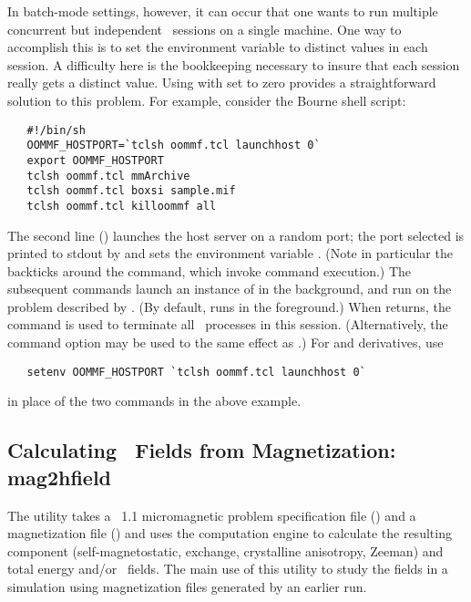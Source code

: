 In batch-mode settings, however, it can occur that one wants to run
multiple concurrent but independent \OOMMF\ sessions on a single
machine.  One way to accomplish this is to set the environment
variable  to distinct values in each session.
A difficulty here is the bookkeeping necessary to insure that each
session really gets a distinct value.  Using  with
 set to zero provides a straightforward solution to this
problem.  For example, consider the Bourne shell script:
\begin{verbatim}
   #!/bin/sh
   OOMMF_HOSTPORT=`tclsh oommf.tcl launchhost 0`
   export OOMMF_HOSTPORT
   tclsh oommf.tcl mmArchive
   tclsh oommf.tcl boxsi sample.mif
   tclsh oommf.tcl killoommf all
\end{verbatim}
The second line () launches the host server
on a random port; the port selected is printed to stdout by
 and sets the environment variable
.  (Note in particular the backticks around the
 command, which invoke command execution.)  The
subsequent commands launch an instance of  in the
background, and run  on the problem described by
.  (By default,  runs in the foreground.)
When  returns, the  command is used to
terminate all \OOMMF\ processes in this session.  (Alternatively, the
 command option  may be used to the same effect
as .)  For  and derivatives, use
\begin{verbatim}
   setenv OOMMF_HOSTPORT `tclsh oommf.tcl launchhost 0`
\end{verbatim}
in place of the two  commands in the above
example.



\subsection{Calculating \vH\ Fields from Magnetization:
            mag2hfield}\label{sec:mag2hfield}%

The  utility takes a
\MIF~1.1 micromagnetic problem specification file
() and a
magnetization file () and uses the  computation engine to calculate the resulting
component (self-magnetostatic, exchange, crystalline anisotropy, Zeeman)
and total energy and/or \vH\ fields.  The main use of this utility to study
the fields in a simulation using magnetization files generated by an
earlier
 run.

